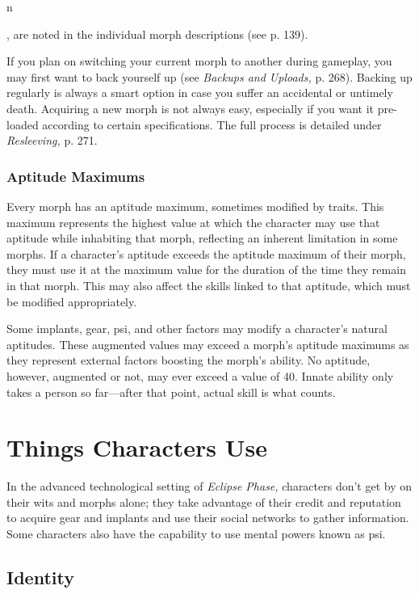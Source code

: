 n 

, 
are noted in the individual morph descriptions (see 
p. 139).

If you plan on switching your current morph to 
another during gameplay, you may first want to back 
yourself up (see \textit{Backups and Uploads,} p. 268). Backing
up regularly is always a smart option in case you
suffer an accidental or untimely death. Acquiring a 
new morph is not always easy, especially if you want 
it pre-loaded according to certain specifications. The 
full process is detailed under \textit{Resleeving,} p. 271.

\subsubsection{Aptitude Maximums}

Every morph has an aptitude maximum, sometimes 
modified by traits. This maximum represents the highest
value at which the character may use that aptitude
while inhabiting that morph, reflecting an inherent 
limitation in some morphs. If a character's aptitude 
exceeds the aptitude maximum of their morph, they 
must use it at the maximum value for the duration 
of the time they remain in that morph. This may also 
affect the skills linked to that aptitude, which must be 
modified appropriately.

Some implants, gear, psi, and other factors may 
modify a character's natural aptitudes. These augmented
values may exceed a morph's aptitude maximums
as they represent external factors boosting the
morph's ability. No aptitude, however, augmented or 
not, may ever exceed a value of 40. Innate ability only 
takes a person so far—after that point, actual skill is 
what counts.

\section{Things Characters Use}

In the advanced technological setting of \textit{Eclipse Phase,} 
characters don't get by on their wits and morphs 
alone; they take advantage of their credit and reputation
to acquire gear and implants and use their social
networks to gather information. Some characters also 
have the capability to use mental powers known as psi.

\subsection{Identity}

